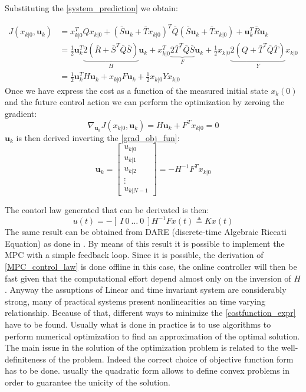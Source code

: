 Substituting the \ref{system_prediction} we obtain:

\begin{equation}\label{costfunction_expr}
\begin{split} 
 J(x_{k|0},\textbf{u}_k)&=x_{k|0}^T Q x_{k|0} + (\bar{S}\textbf{u}_k+\bar{T}x_{k|0})^T\bar{Q}(\bar{S}\textbf{u}_k+\bar{T}x_{k|0}) + \textbf{u}_k^T\bar{R}\textbf{u}_k \\ 
 &= \frac{1}{2}\textbf{u}_k^T \underbrace{2(\bar{R}+\bar{S}^T\bar{Q}\bar{S})}_{H}\textbf{u}_k + x_{k|0}^T\underbrace{2\bar{T}^T\bar{Q}\bar{S}}_{F}\textbf{u}_k+\frac{1}{2}x_{k|0}\underbrace{2(Q+\bar{T}^T\bar{Q}\bar{T})}_{Y}x_{k|0} \\
 &=\frac{1}{2}\textbf{u}_k^TH\textbf{u}_k+x_{k|0}F\textbf{u}_k+\frac{1}{2}x_{k|0}Yx_{k|0}
 \end{split}
\end{equation}
Once we have express the cost as a function of the measured initial state $x_k(0)$ and the future control action we can perform the optimization by zeroing the gradient:
\begin{equation}
	\nabla_{\textbf{u}_k}J(x_{k|0},\textbf{u}_k)=H\textbf{u}_k+F^Tx_{k|0}=0
\end{equation}
\label{grad_obj_fun}
$\textbf{u}_k$ is then derived inverting the \ref{grad_obj_fun}:
\begin{equation*}\label{MPC_control_law}
	\textbf{u}_k= \left[
	\begin{matrix}
			u_{k|0} \\ u_{k|1} \\ u_{k|2} \\ \vdots \\ u_{k|N-1}
	\end{matrix}\right] = -H^{-1}F^Tx_{k|0}
\end{equation*} 

The contorl law generated that can be derivated is then:
\begin{equation}
u(t)=-\left[\ I\ 0\ \dots\  0\ \right]H^{-1}Fx(t)\triangleq Kx(t)
\end{equation}
The same result can be obtained from DARE (discrete-time Algebraic Riccati Equation) as done in \cite{magni2006complementi}.
By means of this result it is possible to implement the MPC with a simple feedback loop. Since it is possible, the derivation of \ref{MPC_control_law} is done offline in this case, the online controller will then be fast given that the computational effort depend almost only on the inversion of $H$. 
Anyway the assuptions of Linear and time invariant system are considerably strong, many of practical systems present nonlinearities an time varying relationship. Because of that, different ways to minimize the \ref{costfunction_expr} have to be found.
Usually what is done in practice is to use algorithms to perform numerical optimization to find an approximation of the optimal solution. The main issue in the solution of the optimization problem is related to the well-definiteness of the problem. Indeed the correct choice of objective function form has to be done. usually the quadratic form allows to define convex problems in order to guarantee the unicity of the solution.

